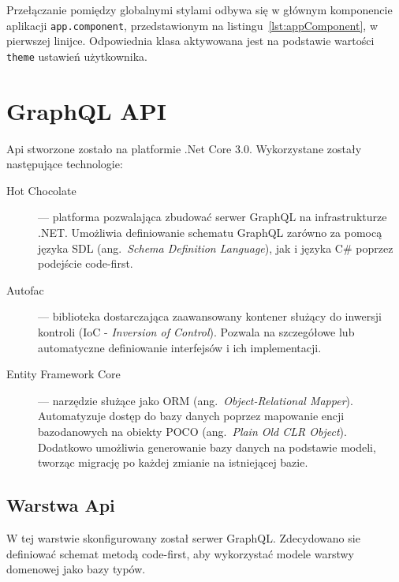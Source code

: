 		Przełączanie pomiędzy globalnymi stylami odbywa się w głównym komponencie aplikacji \verb|app.component|,
		przedstawionym na listingu~\ref{lst:appComponent}, w pierwszej linijce.
		Odpowiednia klasa aktywowana jest na podstawie wartości \verb|theme| ustawień użytkownika.

\section{GraphQL API}
	Api stworzone zostało na platformie .Net Core 3.0.
	Wykorzystane zostały następujące technologie:
	\begin{description}
		\item[Hot Chocolate] --- platforma pozwalająca zbudować serwer GraphQL na infrastrukturze .NET.
			Umożliwia definiowanie schematu GraphQL zarówno za pomocą języka SDL (ang.\ \emph{Schema Definition Language}),
			jak i języka C\# poprzez podejście code-first. 
		\item[Autofac] --- biblioteka dostarczająca zaawansowany kontener służący do inwersji kontroli (IoC - \emph{Inversion of Control}).
			Pozwala na szczegółowe lub automatyczne definiowanie interfejsów i ich implementacji.
		\item[Entity Framework Core] --- narzędzie służące jako ORM (ang.\ \emph{Object-Relational Mapper}).
			Automatyzuje dostęp do bazy danych poprzez mapowanie encji bazodanowych na obiekty POCO (ang.\ \emph{Plain Old CLR Object}).
			Dodatkowo umożliwia generowanie bazy danych na podstawie modeli, tworząc migrację po każdej zmianie na istniejącej bazie.
	\end{description}

	\subsection{Warstwa Api}
		W tej warstwie skonfigurowany został serwer GraphQL.
		Zdecydowano sie definiować schemat metodą code-first, aby wykorzystać modele warstwy domenowej jako bazy typów.

